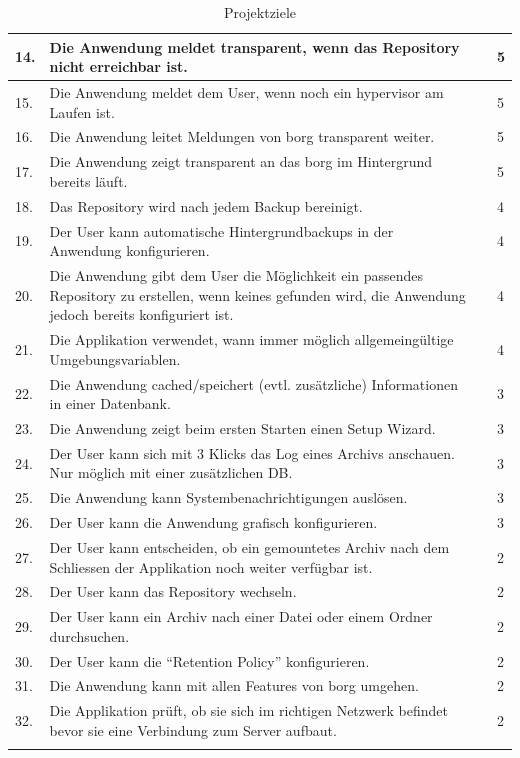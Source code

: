 \begin{longtable}{|p{1cm}|p{9cm}|p{1.5cm}|p{2cm}|}
\hline
14. & Die Anwendung meldet transparent, wenn das Repository nicht erreichbar ist. &  & 5\\
\hline
15. & Die Anwendung meldet dem User, wenn noch ein \gls{hypervisor} am Laufen ist. &  & 5\\
\hline
16. & Die Anwendung leitet Meldungen von \gls{borg} transparent weiter. &  & 5\\
\hline
17. & Die Anwendung zeigt transparent an das \gls{borg} im Hintergrund bereits läuft. &  & 5\\
\hline
18. & Das Repository wird nach jedem Backup bereinigt. &  & 4\\
\hline
19. & Der User kann automatische Hintergrundbackups in der Anwendung konfigurieren. &  & 4\\
\hline
20. & Die Anwendung gibt dem User die Möglichkeit ein passendes Repository zu erstellen, wenn keines gefunden wird, die Anwendung jedoch bereits konfiguriert ist. &  & 4\\
\hline
21. & Die Applikation verwendet, wann immer möglich allgemeingültige Umgebungsvariablen. &  & 4\\
\hline
22. & Die Anwendung cached/speichert (evtl. zusätzliche) Informationen in einer Datenbank. &  & 3\\
\hline
23. & Die Anwendung zeigt beim ersten Starten einen Setup Wizard. &  & 3\\
\hline
24. & Der User kann sich mit 3 Klicks das Log eines Archivs anschauen. Nur möglich mit einer zusätzlichen DB. &  & 3\\
\hline
25. & Die Anwendung kann Systembenachrichtigungen auslösen. &  & 3\\
\hline
26. & Der User kann die Anwendung grafisch konfigurieren. &  & 3\\
\hline
27. & Der User kann entscheiden, ob ein gemountetes Archiv nach dem Schliessen der Applikation noch weiter verfügbar ist. &  & 2\\
\hline
28. & Der User kann das Repository wechseln. &  & 2\\
\hline
29. & Der User kann ein Archiv nach einer Datei oder einem Ordner durchsuchen. &  & 2\\
\hline
30. & Der User kann die "`Retention Policy"' konfigurieren. &  & 2\\
\hline
31. & Die Anwendung kann mit allen Features von \gls{borg} umgehen. &  & 2\\
\hline
32. & Die Applikation prüft, ob sie sich im richtigen Netzwerk befindet bevor sie eine Verbindung zum Server aufbaut. &  & 2\\
\hline
\caption{\label{tab:org2ab4045}
Projektziele}
\\
\end{longtable}

